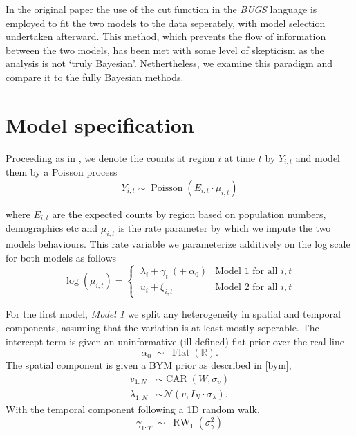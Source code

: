 \documentclass[11pt]{report}
\begin{document}
In the original paper \citet{baystdetect} the use of the cut function in the \emph{BUGS} language is employed to fit the two models to the data seperately, with model selection undertaken afterward. This method, which prevents the flow of information between the two models, has been met with some level of skepticism \citep{gelmancut} as the analysis is not `truly Bayesian'. Nethertheless, we examine this paradigm and compare it to the fully Bayesian methods. 

\section{Model specification}

Proceeding as in \citet{baystdetect}, we denote the counts at region $i$ at time $t$ by $Y_{i,t}$ and model them by a Poisson process
\begin{equation}
Y_{i,t} \sim \operatorname{Poisson}(E_{i,t} \cdot \mu_{i,t})
\end{equation}

where $E_{i,t}$ are the expected counts by region based on population numbers, demographics etc and $\mu_{i,t}$ is the rate parameter by which we impute the two models behaviours. This rate variable we parameterize additively on the log scale for both models as follows
\begin{equation}
\log{(\mu_{i,t})} = \begin{cases}
\ \lambda_{i} + \gamma_{t} \  (+ \  \alpha_0) & \textrm{Model 1 for all } i, t \\
\ u_{i} + \xi_{i,t} & \textrm{Model 2 for all } i, t
\end{cases}
\end{equation}

For the first model, \emph{Model 1} we split any heterogeneity in spatial and temporal components, assuming that the variation is at least mostly seperable. The intercept term is given an uninformative (ill-defined) flat prior over the real line
\begin{equation} \label{eq:intercept}
\alpha_0 \;\sim\; \operatorname{Flat}(\mathbb{R}).
\end{equation}
The spatial component is given a BYM prior as described in \ref{bym},
\begin{align}
v_{1:N} &\sim \operatorname{CAR}(W, \sigma_v) \\
\lambda_{1:N} &\sim \mathcal{N}(v, I_N \cdot \sigma_\lambda).
\end{align}
With the temporal component following a 1D random walk,
\begin{equation*}
\gamma_{1:T} \;\sim\; \operatorname{RW}_1(\sigma_\gamma^2)
\end{equation*}
\end{document}
